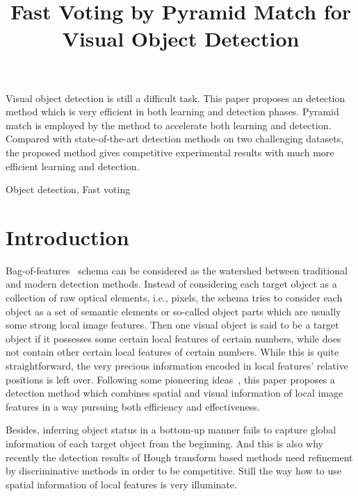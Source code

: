 \documentclass[paper]{ieice}
\title{Fast Voting by Pyramid Match for Visual Object Detection}
\begin{document}
\maketitle
\begin{summary}
Visual object detection is still a difficult task. This paper proposes an detection method which is very efficient in both learning and detection phases. Pyramid match is employed by the method to accelerate both learning and detection. Compared with state-of-the-art detection methods on two challenging datasets, the proposed method gives competitive experimental results with much more efficient  learning and detection.
\end{summary}
\begin{keywords}
Object detection, Fast voting
\end{keywords}

\section{Introduction}

Bag-of-features~\cite{obof,bgf} schema can be considered as the watershed between traditional and modern detection methods. Instead of considering each target object as a collection of raw optical elements, i.e., pixels, the schema tries to consider each object as a set of semantic elements or so-called object parts which are usually some strong local image features. Then one visual object is said to be a target object if it possesses some certain local features of certain numbers, while does not contain other certain local features of certain numbers. While this is quite straightforward, the very precious information encoded in local features' relative positions is left over. Following some pioneering ideas~\cite{spmk,ac30}, this paper proposes a detection method which combines spatial and visual information of local image features in a  way pursuing both efficiency and effectiveness.

 Besides, inferring object status in a bottom-up manner fails to capture global information of each target object from the beginning. And this is also why recently the detection results of Hough transform based methods need refinement by discriminative methods in order to be competitive. Still the way how to use spatial information of local features is very illuminate.
\end{document}
